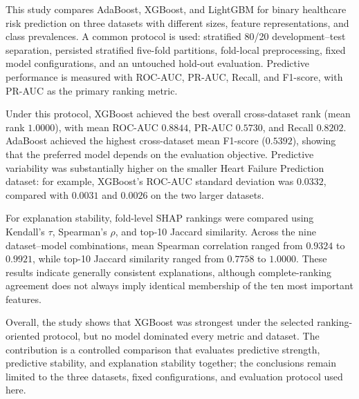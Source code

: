 This study compares AdaBoost, XGBoost, and LightGBM for binary healthcare risk prediction on three datasets with different sizes, feature representations, and class prevalences. A common protocol is used: stratified 80/20 development--test separation, persisted stratified five-fold partitions, fold-local preprocessing, fixed model configurations, and an untouched hold-out evaluation. Predictive performance is measured with ROC-AUC, PR-AUC, Recall, and F1-score, with PR-AUC as the primary ranking metric.

Under this protocol, XGBoost achieved the best overall cross-dataset rank (mean rank $1.0000$), with mean ROC-AUC $0.8844$, PR-AUC $0.5730$, and Recall $0.8202$. AdaBoost achieved the highest cross-dataset mean F1-score ($0.5392$), showing that the preferred model depends on the evaluation objective. Predictive variability was substantially higher on the smaller Heart Failure Prediction dataset: for example, XGBoost's ROC-AUC standard deviation was $0.0332$, compared with $0.0031$ and $0.0026$ on the two larger datasets.

For explanation stability, fold-level SHAP rankings were compared using Kendall's $\tau$, Spearman's $\rho$, and top-10 Jaccard similarity. Across the nine dataset--model combinations, mean Spearman correlation ranged from $0.9324$ to $0.9921$, while top-10 Jaccard similarity ranged from $0.7758$ to $1.0000$. These results indicate generally consistent explanations, although complete-ranking agreement does not always imply identical membership of the ten most important features.

Overall, the study shows that XGBoost was strongest under the selected ranking-oriented protocol, but no model dominated every metric and dataset. The contribution is a controlled comparison that evaluates predictive strength, predictive stability, and explanation stability together; the conclusions remain limited to the three datasets, fixed configurations, and evaluation protocol used here.
